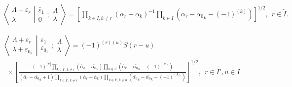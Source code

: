 \documentclass[12pt]{article}
\def\nn{\nonumber}
\begin{document}
\begin{align}
&\left\langle\left. 
\begin{array}{c} \Lambda-\varepsilon_r\\ \lambda
 \end{array}
\right|\right.
\left.
\begin{array}{c} \bar{\varepsilon}_1 \\ 0 
 \end{array}
; \begin{array}{c} \Lambda \\ \lambda
 \end{array}
\right\rangle
= \left[ \prod_{k\in \tilde{I},k\neq r} \left(\alpha_r - \alpha_k \right)^{-1}\prod_{k\in
I} \left(\alpha_r - {\alpha_0}_k - (-1)^{(k)}\right) \right]^{1/2}
,\ \ r\in \tilde{I} .
\end{align}



\begin{align}
& \left\langle\left. 
\begin{array}{c} \Lambda+\varepsilon_r\\ \lambda+\varepsilon_{0_u} 
 \end{array}
\right|\right.
\left.
\begin{array}{c} \varepsilon_1 \\ \varepsilon_{0_1} 
 \end{array}
; \begin{array}{c} \Lambda \\ \lambda
 \end{array}
\right\rangle = (-1)^{(r)(u)} S(r-u) \nn\\
&~~\times 
\left[ 
\frac{
(-1)^{|I'|} \prod_{k\in\tilde{I'},k \neq r} \left(\bar{\alpha}_k - \bar{\alpha_0}_u \right)
\prod_{k\in I'} \left(\bar{\alpha}_r - \bar{\alpha_0}_k - (-1)^{(k)}\right) 
}
{
(\bar{\alpha}_r-\bar{\alpha_0}_u + 1)
\prod_{k\in \tilde{I'},k\neq r} \left(\bar{\alpha}_r - \bar{\alpha}_k \right)
\prod_{k\in I',k\neq u} \left(\bar{\alpha_0}_u - \bar{\alpha_0}_k - (-1)^{(k)}\right)
}
\right]^{1/2}
, \ \ r\in \tilde{I'},u\in I   \label{FinalBarredEven}
\end{align}
\end{document}
